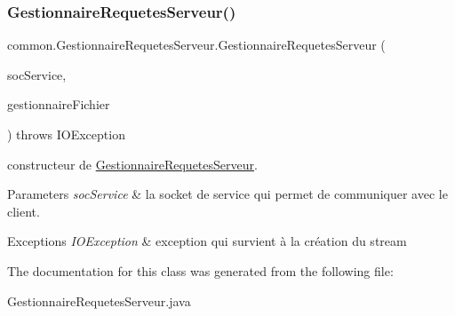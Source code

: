 \subsubsection{\texorpdfstring{Gestionnaire\+Requetes\+Serveur()}{GestionnaireRequetesServeur()}}
{\footnotesize\ttfamily common.\+Gestionnaire\+Requetes\+Serveur.\+Gestionnaire\+Requetes\+Serveur (\begin{DoxyParamCaption}\item[{Socket}]{soc\+Service,  }\item[{\hyperlink{classcommon_1_1GestionnaireFichier}{Gestionnaire\+Fichier}}]{gestionnaire\+Fichier }\end{DoxyParamCaption}) throws I\+O\+Exception\hspace{0.3cm}{\ttfamily [inline]}}



constructeur de \hyperlink{classcommon_1_1GestionnaireRequetesServeur}{Gestionnaire\+Requetes\+Serveur}. 


\begin{DoxyParams}{Parameters}
{\em soc\+Service} & la socket de service qui permet de communiquer avec le client. \\
\hline
\end{DoxyParams}

\begin{DoxyExceptions}{Exceptions}
{\em I\+O\+Exception} & exception qui survient à la création du stream \\
\hline
\end{DoxyExceptions}


The documentation for this class was generated from the following file\+:\begin{DoxyCompactItemize}
\item 
Gestionnaire\+Requetes\+Serveur.\+java\end{DoxyCompactItemize}
